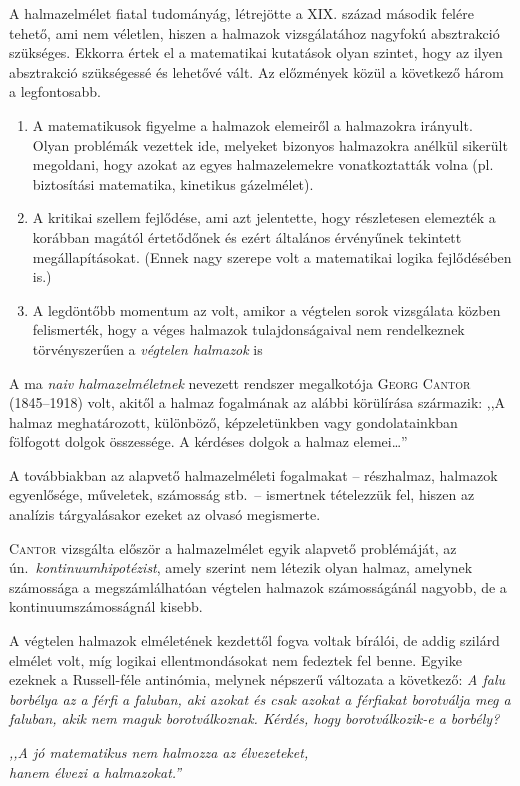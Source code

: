 \documentclass[a4paper,12pt]{article}
\begin{document}
A halmazelmélet fiatal tudományág, létrejötte a XIX. század második
felére tehető, ami nem véletlen, hiszen a halmazok vizsgálatához nagyfokú
absztrakció szükséges. Ekkorra értek el a matematikai kutatások olyan szintet,
hogy az ilyen absztrakció szükségessé és lehetővé vált. Az előzmények
közül a következő három a legfontosabb.
\begin{enumerate}
	\item A matematikusok figyelme a halmazok elemeiről a halmazokra irányult. Olyan problémák vezettek ide, melyeket bizonyos halmazokra anélkül sikerült megoldani, hogy azokat az egyes halmazelemekre vonatkoztatták volna (pl. biztosítási matematika, kinetikus gázelmélet).
	\item A kritikai szellem fejlődése, ami azt jelentette, hogy részletesen elemezték a korábban magától értetődőnek és ezért általános érvényűnek tekintett megállapításokat. (Ennek nagy szerepe volt a matematikai
	logika fejlődésében is.)
	\item A legdöntőbb momentum az volt, amikor a végtelen sorok vizsgálata közben felismerték, hogy a véges halmazok tulajdonságaival nem rendelkeznek törvényszerűen a \emph{végtelen halmazok} is
\end{enumerate}

A ma \emph{naiv halmazelméletnek} nevezett rendszer megalkotója \textsc{Georg Cantor} (1845--1918) volt, akitől a halmaz fogalmának az alábbi körülírása származik: ,,A halmaz meghatározott, különböző, képzeletünkben vagy gondolatainkban fölfogott dolgok összessége. A kérdéses dolgok a halmaz elemei\dots''

A továbbiakban az alapvető halmazelméleti fogalmakat -- részhalmaz, halmazok egyenlősége, műveletek, számosság stb.~-- ismertnek tételezzük fel, hiszen az analízis tárgyalásakor ezeket az olvasó megismerte.

\textsc{Cantor} vizsgálta először a halmazelmélet egyik alapvető problémáját, az ún.~\emph{kontinuumhipotézist}, amely szerint nem létezik olyan halmaz, amelynek számossága a megszámlálhatóan végtelen halmazok számosságánál nagyobb, de a kontinuumszámosságnál kisebb.

\bigskip
A végtelen halmazok elméletének kezdettől fogva voltak bírálói, de addig szilárd elmélet volt, míg logikai ellentmondásokat nem fedeztek fel benne. Egyike ezeknek a Russell-féle antinómia, melynek népszerű változata a következő: \emph{A falu borbélya az a férfi a faluban, aki azokat és csak azokat a férfiakat borotválja meg a faluban, akik nem maguk borotválkoznak. Kérdés, hogy borotválkozik-e a borbély?}

\begin{flushright}
\emph{	{\footnotesize ,,A jó matematikus nem halmozza az élvezeteket,\\
hanem élvezi a halmazokat.''}}
\end{flushright}
\end{document}

